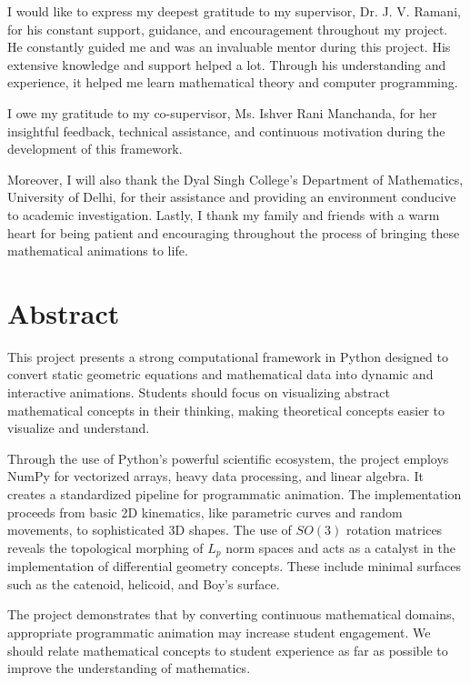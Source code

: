 \documentclass[12pt, a4paper]{report}
\begin{document}
I would like to express my deepest gratitude to my supervisor, Dr. J. V. Ramani, for his constant support, guidance, and encouragement throughout my project. He constantly guided me and was an invaluable mentor during this project. His extensive knowledge and support helped a lot. Through his understanding and experience, it helped me learn mathematical theory and computer programming. 

I owe my gratitude to my co-supervisor, Ms. Ishver Rani Manchanda, for her insightful feedback, technical assistance, and continuous motivation during the development of this framework. 

Moreover, I will also thank the Dyal Singh College's Department of Mathematics, University of Delhi, for their assistance and providing an environment conducive to academic investigation. Lastly, I thank my family and friends with a warm heart for being patient and encouraging throughout the process of bringing these mathematical animations to life.

\clearpage

\chapter*{Abstract}

This project presents a strong computational framework in Python designed to convert static geometric equations and mathematical data into dynamic and interactive animations. Students should focus on visualizing abstract mathematical concepts in their thinking, making theoretical concepts easier to visualize and understand. 

Through the use of Python's powerful scientific ecosystem, the project employs NumPy for vectorized arrays, heavy data processing, and linear algebra. It creates a standardized pipeline for programmatic animation. The implementation proceeds from basic 2D kinematics, like parametric curves and random movements, to sophisticated 3D shapes. The use of $SO(3)$ rotation matrices reveals the topological morphing of $L_p$ norm spaces and acts as a catalyst in the implementation of differential geometry concepts. These include minimal surfaces such as the catenoid, helicoid, and Boy's surface. 

The project demonstrates that by converting continuous mathematical domains, appropriate programmatic animation may increase student engagement. We should relate mathematical concepts to student experience as far as possible to improve the understanding of mathematics.
\end{document}
